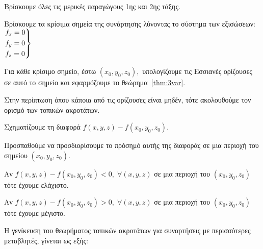 \documentclass[a4paper,table]{report}
\begin{document}
\begin{enumerate}
  \item Βρίσκουμε όλες τις μερικές παραγώγους 1ης και 2ης τάξης.
  \item Βρίσκουμε τα κρίσιμα σημεία της συνάρτησης λύνοντας το σύστημα των εξισώσεων: 
    $ \begin{rcases}
      f_{x} = 0 \\
      f_{y} = 0 \\
      f_{z} = 0
    \end{rcases} $
  \item Για κάθε κρίσιμο σημείο, έστω $ (x_{0}, y_{0}, z_{0}), $ υπολογίζουμε 
    τις Εσσιανές ορίζουσες σε αυτό το σημείο και εφαρμόζουμε το 
    θεώρημα~\ref{thm:3var}.
  \item Στην περίπτωση όπου κάποια από τις ορίζουσες είναι μηδέν, τότε 
    ακολουθούμε τον ορισμό των τοπικών ακροτάτων.
    \begin{myitemize}
      \item Σχηματίζουμε τη διαφορά $ f(x,y,z) - f(x_{0}, y_{0}, z_{0}) $.
      \item Προσπαθούμε να προσδιορίσουμε το πρόσημό αυτής της διαφοράς σε 
        μια περιοχή του σημείου $ (x_{0}, y_{0}, z_{0}) $.
        \begin{myitemize}
          \item Αν $ f(x,y,z) - f(x_{0}, y_{0}, z_{0}) < 0, \; 
            \forall (x,y,z) $ σε μια
            περιοχή του $ (x_{0}, y_{0}, z_{0}) $ τότε έχουμε ελάχιστο. 
          \item Αν $ f(x,y,z) - f(x_{0}, y_{0}, z_{0}) > 0, \; 
            \forall (x,y,z) $ σε μια
            περιοχή του $ (x_{0}, y_{0}, z_{0}) $ τότε έχουμε μέγιστο. 
        \end{myitemize}
    \end{myitemize}
\end{enumerate}

Η γενίκευση του θεωρήματος τοπικών ακροτάτων για συναρτήσεις με περισσότερες 
μεταβλητές, γίνεται ως εξής: 
\end{document}
